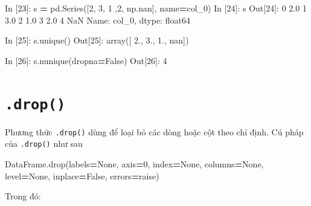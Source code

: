 \documentclass[
]{book}
\newenvironment{Shaded}{\begin{snugshade}}{\end{snugshade}}
\newcommand{\DecValTok}[1]{\textcolor[rgb]{0.00,0.00,0.81}{#1}}
\newcommand{\FloatTok}[1]{\textcolor[rgb]{0.00,0.00,0.81}{#1}}
\newcommand{\NormalTok}[1]{#1}
\newcommand{\OperatorTok}[1]{\textcolor[rgb]{0.81,0.36,0.00}{\textbf{#1}}}
\newcommand{\StringTok}[1]{\textcolor[rgb]{0.31,0.60,0.02}{#1}}
\newcommand{\VariableTok}[1]{\textcolor[rgb]{0.00,0.00,0.00}{#1}}
\begin{document}
\begin{Shaded}
\begin{Highlighting}[]
\NormalTok{In [}\DecValTok{23}\NormalTok{]: s }\OperatorTok{=}\NormalTok{ pd.Series([}\DecValTok{2}\NormalTok{, }\DecValTok{3}\NormalTok{, }\DecValTok{1}\NormalTok{ ,}\DecValTok{2}\NormalTok{, np.nan], name}\OperatorTok{=}\StringTok{\textquotesingle{}col\_0\textquotesingle{}}\NormalTok{)}
\NormalTok{In [}\DecValTok{24}\NormalTok{]: s}
\NormalTok{Out[}\DecValTok{24}\NormalTok{]:}
\DecValTok{0}    \FloatTok{2.0}
\DecValTok{1}    \FloatTok{3.0}
\DecValTok{2}    \FloatTok{1.0}
\DecValTok{3}    \FloatTok{2.0}
\DecValTok{4}\NormalTok{    NaN}
\NormalTok{Name: col\_0, dtype: float64}

\NormalTok{In [}\DecValTok{25}\NormalTok{]: s.unique()}
\NormalTok{Out[}\DecValTok{25}\NormalTok{]: array([ }\FloatTok{2.}\NormalTok{,  }\FloatTok{3.}\NormalTok{,  }\FloatTok{1.}\NormalTok{, nan])}

\NormalTok{In [}\DecValTok{26}\NormalTok{]: s.nunique(dropna}\OperatorTok{=}\VariableTok{False}\NormalTok{)}
\NormalTok{Out[}\DecValTok{26}\NormalTok{]: }\DecValTok{4}
\end{Highlighting}
\end{Shaded}

\section{\texorpdfstring{\texttt{.drop()}}{.drop()}}\label{drop}

Phương thức \texttt{.drop()} dùng để loại bỏ các dòng hoặc cột theo chỉ định.
Cú pháp của \texttt{.drop()} như sau

\begin{Shaded}
\begin{Highlighting}[]
\NormalTok{DataFrame.drop(labels}\OperatorTok{=}\VariableTok{None}\NormalTok{, axis}\OperatorTok{=}\DecValTok{0}\NormalTok{, index}\OperatorTok{=}\VariableTok{None}\NormalTok{, columns}\OperatorTok{=}\VariableTok{None}\NormalTok{, level}\OperatorTok{=}\VariableTok{None}\NormalTok{, inplace}\OperatorTok{=}\VariableTok{False}\NormalTok{, errors}\OperatorTok{=}\StringTok{\textquotesingle{}raise\textquotesingle{}}\NormalTok{)}
\end{Highlighting}
\end{Shaded}

Trong đó:
\end{document}
